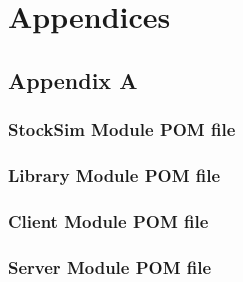 \chapter{Appendices}
\section*{Appendix A}
\subsection*{StockSim Module POM file}

\subsection*{Library Module POM file}

\subsection*{Client Module POM file}

\subsection*{Server Module POM file}

